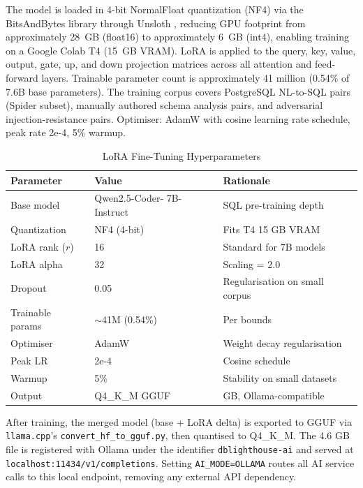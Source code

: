 \documentclass[conference]{IEEEtran}
\begin{document}
The model is loaded in 4-bit NormalFloat quantization (NF4) via the
BitsAndBytes library through Unsloth \cite{han2024unsloth}, reducing GPU
footprint from approximately 28~GB (float16) to approximately 6~GB
(int4), enabling training on a Google Colab T4 (15~GB VRAM). LoRA
\cite{hu2022lora} is applied to the query, key, value, output, gate, up,
and down projection matrices across all attention and feed-forward layers.
Trainable parameter count is approximately 41 million (0.54\% of 7.6B
base parameters). The training corpus covers PostgreSQL NL-to-SQL pairs
(Spider \cite{yu2018spider} subset), manually authored schema analysis
pairs, and adversarial injection-resistance pairs. Optimiser: AdamW with
cosine learning rate schedule, peak rate 2e-4, 5\% warmup.

\begin{table}[htbp]
\caption{LoRA Fine-Tuning Hyperparameters}
\label{tab:lora}
\begin{tabular}{>{\raggedright}p{1.8cm} >{\raggedright}p{2.2cm} >{\raggedright\arraybackslash}p{2.8cm}}
\toprule
\textbf{Parameter} & \textbf{Value} & \textbf{Rationale} \\
\midrule
Base model & Qwen2.5-Coder- 7B-Instruct & SQL pre-training depth \\
Quantization & NF4 (4-bit) & Fits T4 15 GB VRAM \\
LoRA rank ($r$) & 16 & Standard for 7B models \\
LoRA alpha & 32 & Scaling = 2.0 \\
Dropout & 0.05 & Regularisation on small corpus \\
Trainable params & $\sim$41M (0.54\%) & Per \cite{hu2022lora} bounds \\
Optimiser & AdamW & Weight decay regularisation \\
Peak LR & 2e-4 & Cosine schedule \\
Warmup & 5\% & Stability on small datasets \\
Output & Q4\_K\_M GGUF & 4.6 GB, Ollama-compatible \\
\bottomrule
\end{tabular}
\end{table}

After training, the merged model (base + LoRA delta) is exported to GGUF
via \texttt{llama.cpp}'s \texttt{convert\_hf\_to\_gguf.py}, then
quantised to Q4\_K\_M. The 4.6 GB file is registered with Ollama under
the identifier \texttt{dblighthouse-ai} and served at
\texttt{localhost:11434/v1/completions}. Setting \texttt{AI\_MODE=OLLAMA}
routes all AI service calls to this local endpoint, removing any external
API dependency.
\end{document}
